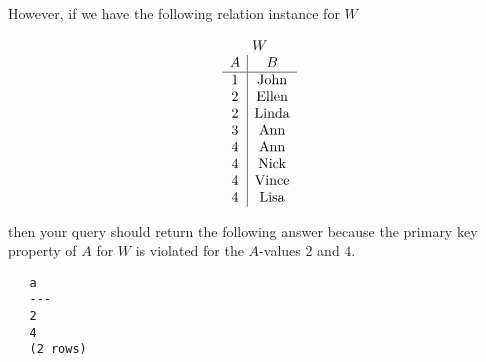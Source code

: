 \begin{enumerate}
  However, if we have the following relation instance for $W$

  \[
  \begin{array}{c}
    W \\
    \begin{array}{c|c}
      A & B \\ \hline
      1 & \mbox{\rm John} \\
      2 & \mbox{\rm Ellen} \\
      2 & \mbox{\rm Linda} \\
      3 & \mbox{\rm Ann} \\
      4 & \mbox{\rm Ann} \\
      4 & \mbox{\rm Nick} \\
      4 & \mbox{\rm Vince}\\
      4 & \mbox{\rm Lisa}
    \end{array}
  \end{array}
  \]

  then your query should return the following answer because the
  primary key property of $A$ for $W$ is violated for the $A$-values
  $2$ and $4$.

  \begin{verbatim}
   a 
   ---
   2
   4
   (2 rows)
 \end{verbatim}
    \setcounter{enumTemp}{\theenumi}


\end{enumerate} 





